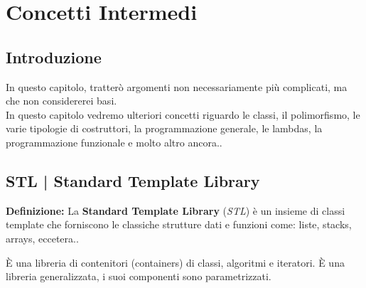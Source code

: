 
\chapter{Concetti Intermedi}






\section{Introduzione}

\textsf{\small In questo capitolo, tratterò argomenti non necessariamente più complicati, ma che non considererei basi. } \\

\textsf{\small In questo capitolo vedremo ulteriori concetti riguardo le classi, il polimorfismo, le varie tipologie di costruttori, la programmazione generale, le lambdas, la programmazione funzionale e molto altro ancora..} \break



\section{STL | Standard Template Library}

\textsf{\small \textbf{Definizione: } La \textbf{Standard Template Library} (\emph{STL}) è un insieme di classi template che forniscono le classiche strutture dati e funzioni come: liste, stacks, arrays, eccetera..} \break

\textsf{\small È una libreria di contenitori (containers) di classi, algoritmi e iteratori. È una libreria generalizzata, i suoi componenti sono parametrizzati.} \\

